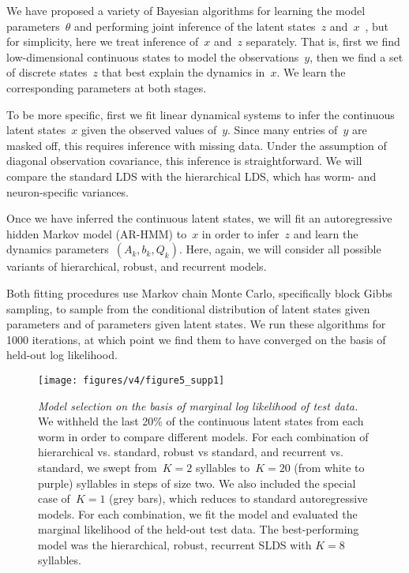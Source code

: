 \documentclass[11pt]{article}
\begin{document}
We have proposed a variety of Bayesian algorithms for learning the
model parameters~$\theta$ and performing joint inference of the
latent states~$z$ and~$x$~\citep{linderman2017recurrent, linderman2017structure},
but for simplicity, here we treat inference of~$x$ and~$z$ separately.
That is, first we find low-dimensional continuous states to model the
observations~$y$, then we find a set of discrete states~$z$ that best
explain the dynamics in~$x$. We learn the corresponding parameters
at both stages.


To be more specific, first we fit linear dynamical systems to infer
the continuous latent states~$x$ given the observed values of~$y$.
Since many entries of~$y$ are masked off, this requires inference
with missing data.  Under the assumption of diagonal observation
covariance, this inference is straightforward.  We will compare the
standard LDS with the hierarchical LDS, which has worm- and neuron-specific
variances.

Once we have inferred the continuous latent states, we will fit
an autoregressive hidden Markov model (AR-HMM) to~$x$ in order
to infer~$z$ and learn the dynamics parameters~$(A_k, b_k, Q_k)$.
Here, again, we will consider all possible variants of hierarchical,
robust, and recurrent models.

Both fitting procedures use Markov chain Monte Carlo, specifically
block Gibbs sampling, to sample from the conditional distribution
of latent states given parameters and of parameters given latent
states.  We run these algorithms for 1000 iterations, at which
point we find them to have converged on the basis of held-out
log likelihood. 


\begin{figure}[t!]
\centering%
\texttt{[image: figures/v4/figure5\_supp1]} 
\caption{\textit{Model selection on the basis of marginal log
    likelihood of test data.}  We withheld the last 20\% of the
  continuous latent states from each worm in order to compare
  different models.  For each combination of hierarchical
  vs. standard, robust vs standard, and recurrent vs. standard, we
  swept from~$K=2$ syllables to~$K=20$ (from white to purple)
  syllables in steps of size two. We also included the special case
  of~$K=1$ (grey bars), which reduces to standard autoregressive
  models. For each combination, we fit the model and evaluated the
  marginal likelihood of the held-out test data. The best-performing
  model was the hierarchical, robust, recurrent SLDS with $K=8$
  syllables.}
\label{fig:model_selection}
\end{figure}
\end{document}
